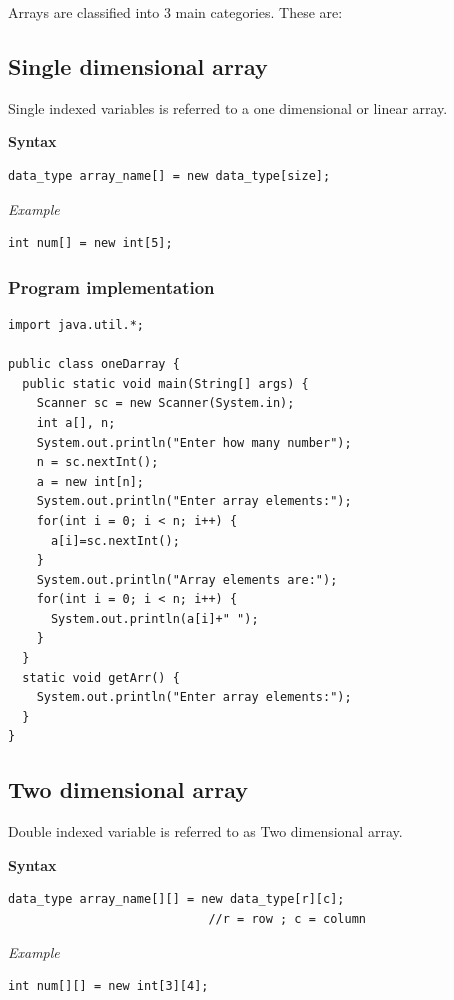 \documentclass[twocolumn, a4paper]{article}
\begin{document}
Arrays are classified into 3 main categories. These are:
\subsection{Single dimensional array}
Single indexed variables is referred to a one dimensional or linear array.

\noindent\textbf{Syntax}
\begin{lstlisting}
data_type array_name[] = new data_type[size];
\end{lstlisting}
\noindent\emph{Example}
\begin{lstlisting}
int num[] = new int[5];
\end{lstlisting}

\subsubsection{Program implementation}
\begin{lstlisting}
import java.util.*;

public class oneDarray {
  public static void main(String[] args) {
    Scanner sc = new Scanner(System.in);
    int a[], n;
    System.out.println("Enter how many number");
    n = sc.nextInt();
    a = new int[n];
    System.out.println("Enter array elements:");
    for(int i = 0; i < n; i++) {
      a[i]=sc.nextInt();
    }
    System.out.println("Array elements are:");
    for(int i = 0; i < n; i++) {
      System.out.println(a[i]+" ");
    }
  }
  static void getArr() {
    System.out.println("Enter array elements:");
  }
}
\end{lstlisting}

\subsection{Two dimensional array}
Double indexed variable is referred to as Two dimensional array.

\noindent\textbf{Syntax}
\begin{lstlisting}
data_type array_name[][] = new data_type[r][c];
                            //r = row ; c = column
\end{lstlisting}
\noindent\emph{Example}
\begin{lstlisting}
int num[][] = new int[3][4];
\end{lstlisting}
\end{document}
